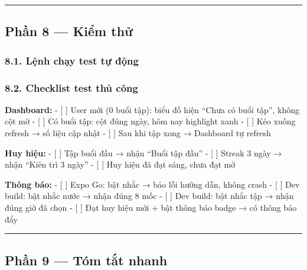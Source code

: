 \documentclass[12pt,a4paper]{article}
\newenvironment{Shaded}{%
  \VerbatimEnvironment
  \begin{quote}\small\ttfamily
}{%
  \end{quote}%
}
\begin{document}
\begin{center}\rule{0.5\linewidth}{0.5pt}\end{center}

\subsection{Phần 8 --- Kiểm thử}\label{phux1ea7n-8-kiux1ec3m-thux1eed}

\subsubsection{8.1. Lệnh chạy test tự
động}\label{lux1ec7nh-chux1ea1y-test-tux1ef1-ux111ux1ed9ng}

\begin{Shaded}
\begin{Highlighting}[]
\end{Highlighting}
\end{Shaded}

\subsubsection{8.2. Checklist test thủ
công}\label{checklist-test-thux1ee7-cuxf4ng}

\textbf{Dashboard:} - {[} {]} User mới (0 buổi tập): biểu đồ hiện ``Chưa
có buổi tập'', không cột mờ - {[} {]} Có buổi tập: cột đúng ngày, hôm
nay highlight xanh - {[} {]} Kéo xuống refresh → số liệu cập nhật - {[}
{]} Sau khi tập xong → Dashboard tự refresh

\textbf{Huy hiệu:} - {[} {]} Tập buổi đầu → nhận ``Buổi tập đầu'' - {[}
{]} Streak 3 ngày → nhận ``Kiên trì 3 ngày'' - {[} {]} Huy hiệu đã đạt
sáng, chưa đạt mờ

\textbf{Thông báo:} - {[} {]} Expo Go: bật nhắc → báo lỗi hướng dẫn,
không crash - {[} {]} Dev build: bật nhắc nước → nhận đúng 8 mốc - {[}
{]} Dev build: bật nhắc tập → nhận đúng giờ đã chọn - {[} {]} Đạt huy
hiệu mới + bật thông báo badge → có thông báo đẩy

\begin{center}\rule{0.5\linewidth}{0.5pt}\end{center}

\subsection{Phần 9 --- Tóm tắt
nhanh}\label{phux1ea7n-9-tuxf3m-tux1eaft-nhanh}
\end{document}
